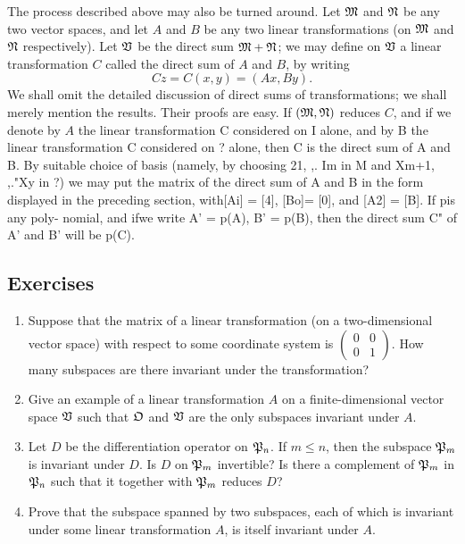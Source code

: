 The process described above may also be turned around. Let \(\frak{M}\) and
\(\frak{N}\) be any two vector spaces, and let \(A\) and \(B\) be any two linear
transformations (on \(\frak{M}\) and \(\frak{N}\) respectively). Let \(\mathfrak{V}\)
be the direct sum \(\frak{M} + \frak{N}\); we may define on \(\mathfrak{V}\) a linear
transformation \(C\) called the direct sum of \(A\) and \(B\), by writing
\begin{equation*}
    Cz = C(x, y) = (Ax, By).
\end{equation*}
We shall omit the detailed discussion of direct sums of transformations; we
shall merely mention the results. Their proofs are easy. If \((\frak{M},
\frak{N})\) reduces \(C\), and if we denote by \(A\) the linear transformation C
considered on I alone, and by B the linear transformation C considered on ?
alone, then C is the direct sum of A and B. By suitable choice of basis (namely,
by choosing 21, ,. Im in M and Xm+1, ,."Xy in ?) we may put the matrix of the
direct sum of A and B in the form displayed in the preceding section, with[Ai] =
[4], [Bo]= [0], and [A2] = [B]. If pis any poly- nomial, and ifwe write A' =
p(A), B' = p(B), then the direct sum C" of A' and B' will be p(C).

{\small
\subsection*{Exercises}
\begin{enumerate}[wide]
    \item Suppose that the matrix of a linear transformation (on a
    two-dimensional vector space) with respect to some coordinate system is
    \(\begin{pmatrix} 0 & 0  \\
        0 & 1 \end{pmatrix}\). How many subspaces are there invariant under the
    transformation?

    \item Give an example of a linear transformation \(A\) on a
    finite-dimensional vector space \(\mathfrak{V}\) such that \(\frak{O}\) and
    \(\mathfrak{V}\) are the only subspaces invariant under \(A\).
    
    \item Let \(D\) be the differentiation operator on \(\mathfrak{P}_n\). If \(m
    \leq n\), then the subspace \(\mathfrak{P}_m\) is invariant under \(D\). Is
    \(D\) on \(\mathfrak{P}_m\) invertible? Is there a complement of \(\mathfrak{P}_m\)
    in \(\mathfrak{P}_n\) such that it together with \(\mathfrak{P}_m\) reduces \(D\)?
    
    \item Prove that the subspace spanned by two subspaces, each of which is
    invariant under some linear transformation \(A\), is itself invariant under
    \(A\).
    
\end{enumerate}

}

